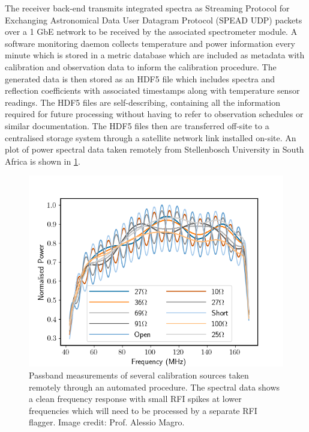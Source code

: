 The receiver back-end transmits integrated spectra as Streaming Protocol for Exchanging Astronomical Data User Datagram Protocol (SPEAD UDP) packets over a 1 GbE network to be received by the associated spectrometer module. A software monitoring daemon collects temperature and power information every minute which is stored in a metric database which are included as metadata with calibration and observation data to inform the calibration procedure. The generated data is then stored as an HDF5 file which includes spectra and reflection coefficients with associated timestamps along with temperature sensor readings. The HDF5 files are self-describing, containing all the information required for future processing without having to refer to observation schedules or similar documentation. The HDF5 files then are transferred off-site to a centralised storage system through a satellite network link installed on-site. An plot of power spectral data taken remotely from Stellenbosch University in South Africa is shown in \cref{fig:remote_data}.
\begin{figure}
    \centering
    \includegraphics[scale=0.6]{remote_data}
    \caption{Passband measurements of several calibration sources taken remotely through an automated procedure. The spectral data shows a clean frequency response with small RFI spikes at lower frequencies which will need to be processed by a separate RFI flagger. Image credit: Prof. Alessio Magro.}
    \label{fig:remote_data}
\end{figure}



